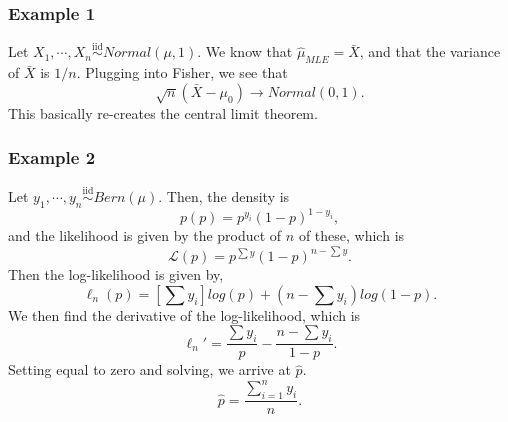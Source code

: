 \documentclass[titlepage, 12pt, leqno]{article}
\begin{document}
\subsubsection{Example 1}
Let $X_{1}, \cdots , X_{n} \overset{\mathrm{iid}}{\sim}Normal(\mu,1)$. We know
that $\hat \mu_{MLE}= \bar X$, and that the variance of $\bar X$ is $1/n$.
Plugging into Fisher, we see that
\[
\sqrt{n}(\bar X - \mu_{0}) \rightarrow Normal(0, 1).
\]
This basically re-creates the central limit theorem.

\subsubsection{Example 2}
Let $y_{1}, \cdots , y_{n} \overset{\mathrm{iid}}{\sim}Bern(\mu)$. Then, the
density is 
\[
p(p) = p^{y_{i}}(1-p)^{1-y_{i}},
\]
and the likelihood is given by the product of $n$ of these, which is
\[
\mathcal{L}(p) = p^{\sum y}(1-p)^{n-\sum y}.
\]
Then the log-likelihood is given by,
\[
    \ell_{n}(p) = [\sum y_{i}]log(p) + (n - \sum y_{i})log(1-p).
\]
We then find the derivative of the log-likelihood, which is
\[
\ell_{n}' = \frac{\sum y_{i}}{p} - \frac{n - \sum y_{i}}{1-p}.
\]
Setting equal to zero and solving, we arrive at $\hat p$.
\[
\boxed{\hat p = \frac{\sum_{i=1}^{n} y_{i}}{n}}.
\]
\end{document}
